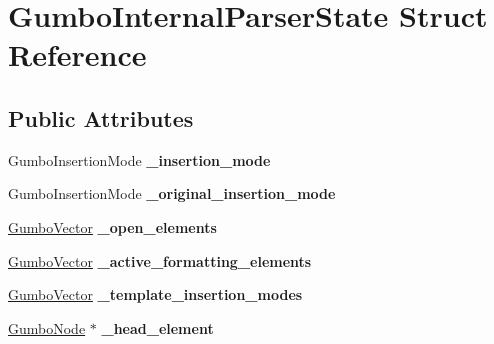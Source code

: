 \hypertarget{struct_gumbo_internal_parser_state}{}\section{Gumbo\+Internal\+Parser\+State Struct Reference}
\label{struct_gumbo_internal_parser_state}
\subsection*{Public Attributes}
\begin{DoxyCompactItemize}
\item 
\mbox{\label{struct_gumbo_internal_parser_state_a044ba6328a5e2d22f0ee5c736a6c4bbe}} 
Gumbo\+Insertion\+Mode {\bfseries \+\_\+insertion\+\_\+mode}
\item 
\mbox{\label{struct_gumbo_internal_parser_state_a6acef86d20ea3eb3cfddde0a91d1cc4d}} 
Gumbo\+Insertion\+Mode {\bfseries \+\_\+original\+\_\+insertion\+\_\+mode}
\item 
\mbox{\label{struct_gumbo_internal_parser_state_af2e5161331e9a875ede624c84c218475}} 
\mbox{\hyperlink{struct_gumbo_vector}{Gumbo\+Vector}} {\bfseries \+\_\+open\+\_\+elements}
\item 
\mbox{\label{struct_gumbo_internal_parser_state_ac32bd2885da1d5efdaf569a36680a433}} 
\mbox{\hyperlink{struct_gumbo_vector}{Gumbo\+Vector}} {\bfseries \+\_\+active\+\_\+formatting\+\_\+elements}
\item 
\mbox{\label{struct_gumbo_internal_parser_state_a594dcf98ec78f4c2018951d784cf632a}} 
\mbox{\hyperlink{struct_gumbo_vector}{Gumbo\+Vector}} {\bfseries \+\_\+template\+\_\+insertion\+\_\+modes}
\item 
\mbox{\label{struct_gumbo_internal_parser_state_a9fa58abf79535bec2a4379d80fb7cd0c}} 
\mbox{\hyperlink{gumbo_8h_a5f67d8397fda8fb7c90cc27f14ac4e7d}{Gumbo\+Node}} $\ast$ {\bfseries \+\_\+head\+\_\+element}
\item 
\mbox{\label{struct_gumbo_internal_parser_state_a53eacd226cb1172ad34c2fe67aeb3df3}} 

\end{DoxyCompactItemize}
